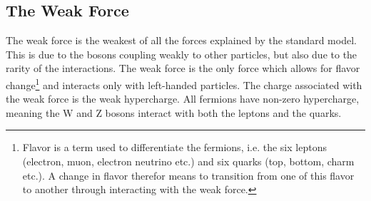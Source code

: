 \subsection{The Weak Force}
The weak force is the weakest of all the forces explained by the standard model. This is due to the bosons 
coupling weakly to other particles, but also due to the rarity of the interactions. The weak force
is the only force which allows for flavor change\footnote{Flavor is a term used to differentiate the 
fermions, i.e. the six leptons (electron, muon, electron neutrino etc.) and six quarks (top, bottom, charm etc.).
A change in flavor therefor means to transition from one of this flavor to another through interacting with 
the weak force.} and interacts only with left-handed particles. The charge associated with the weak force
is the weak hypercharge. All fermions have non-zero hypercharge, meaning the W and Z bosons interact with both 
the leptons and the quarks.  